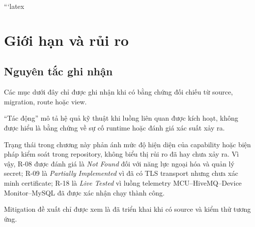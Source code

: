 ```latex
\chapter{Giới hạn và rủi ro}
\label{chap:limitations-risks}

\section{Nguyên tắc ghi nhận}

Các mục dưới đây chỉ được ghi nhận khi có bằng chứng đối chiếu từ source,
migration, route hoặc view.

``Tác động'' mô tả hệ quả kỹ thuật khi luồng liên quan được kích hoạt, không
được hiểu là bằng chứng về sự cố runtime hoặc đánh giá xác suất xảy ra.

Trạng thái trong chương này phản ánh mức độ hiện diện của capability hoặc biện
pháp kiểm soát trong repository, không biểu thị rủi ro đã hay chưa xảy ra.
Vì vậy, R-08 được đánh giá là \textit{Not Found} đối với năng lực ngoại hóa và
quản lý secret; R-09 là \textit{Partially Implemented} vì đã có TLS transport
nhưng chưa xác minh certificate; R-18 là \textit{Live Tested} vì luồng telemetry
MCU--HiveMQ--Device Monitor--MySQL đã được xác nhận chạy thành công.

Mitigation đề xuất chỉ được xem là đã triển khai khi có source và kiểm thử
tương ứng.

\begingroup
\small
\renewcommand{\arraystretch}{1.15}
\setlength{\tabcolsep}{3pt}


